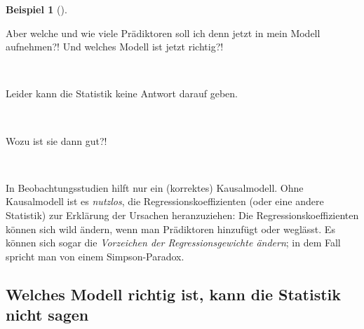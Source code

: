 \documentclass[
  ngerman,
  letterpaper,
  twoside,
  open=any]{scrbook}
\theoremstyle{definition}
\newtheorem{example}{Beispiel}[chapter]
\theoremstyle{plain}
\theoremstyle{definition}
\theoremstyle{definition}
\theoremstyle{remark}
\begin{document}
\begin{example}[]
\begin{tcolorbox}
\end{tcolorbox}

\begin{displayquote}
Aber welche und wie viele Prädiktoren soll ich denn jetzt in mein Modell
aufnehmen?! Und welches Modell ist jetzt richtig?!
\end{displayquote}

🧑

\begin{displayquote}
Leider kann die Statistik keine Antwort darauf geben.
\end{displayquote}

👩

\begin{displayquote}
Wozu ist sie dann gut?!
\end{displayquote}

🧑

\begin{tcolorbox}[enhanced jigsaw, arc=.35mm, bottomrule=.15mm, bottomtitle=1mm, breakable, colback=white, colbacktitle=quarto-callout-important-color!10!white, colframe=quarto-callout-important-color-frame, coltitle=black, left=2mm, leftrule=.75mm, opacityback=0, opacitybacktitle=0.6, rightrule=.15mm, title=\textcolor{quarto-callout-important-color}{\faExclamation}\hspace{0.5em}{Wichtig}, titlerule=0mm, toprule=.15mm, toptitle=1mm]

In Beobachtungsstudien hilft nur ein (korrektes) Kausalmodell. Ohne
Kausalmodell ist es \emph{nutzlos}, die Regressionskoeffizienten (oder
eine andere Statistik) zur Erklärung der Ursachen heranzuziehen: Die
Regressionskoeffizienten können sich wild ändern, wenn man Prädiktoren
hinzufügt oder weglässt. Es können sich sogar die \emph{Vorzeichen der
Regressionsgewichte ändern}; in dem Fall spricht man von einem
Simpson-Paradox.

\end{tcolorbox}

\subsection{Welches Modell richtig ist, kann die Statistik nicht
sagen}\label{welches-modell-richtig-ist-kann-die-statistik-nicht-sagen}


\end{example}
\end{document}
